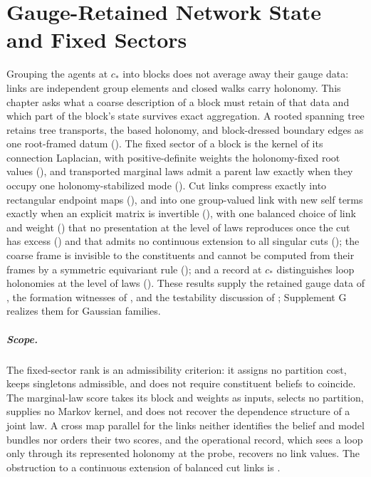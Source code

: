 \chapter[Gauge-Retained Network State and Fixed Sectors]{Gauge-Retained Network State\\and Fixed Sectors}
\label{ch:network-state}

Grouping the agents at $c_*$ into blocks does not average away their gauge data: links are independent
group elements and closed walks carry holonomy. This chapter asks what a coarse description of a block
must retain of that data and which part of the block's state survives exact aggregation. A rooted spanning
tree retains tree transports, the based holonomy, and block-dressed boundary edges as one root-framed datum
(). The fixed sector of a block is the kernel of its connection Laplacian, with
positive-definite weights the holonomy-fixed root values (), and transported
marginal laws admit a parent law exactly when they occupy one holonomy-stabilized mode
(). Cut links compress exactly into rectangular endpoint maps
(), and into one group-valued link with new self terms exactly
when an explicit matrix is invertible (), with one balanced choice of
link and weight () that no presentation at the level of laws
reproduces once the cut has excess () and that admits no continuous
extension to all singular cuts (); the coarse frame is invisible to
the constituents and cannot be computed from their frames by a symmetric equivariant rule
(); and a record at $c_*$ distinguishes loop holonomies at the level of laws
(). These results supply the retained gauge data of
, the formation witnesses of
, and the testability discussion of ; Supplement G
realizes them for Gaussian families.

\paragraph{Scope.} The fixed-sector rank is an admissibility criterion: it assigns no partition cost,
keeps singletons admissible, and does not require constituent beliefs to coincide. The marginal-law score
takes its block and weights as inputs, selects no partition, supplies no Markov kernel, and does not
recover the dependence structure of a joint law. A cross map parallel for the links neither identifies the
belief and model bundles nor orders their two scores, and the operational record, which sees a loop only
through its represented holonomy at the probe, recovers no link values.  The obstruction
to a continuous extension of balanced cut links is .

